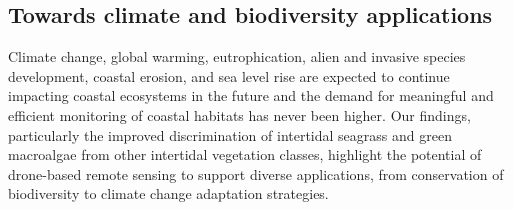 \documentclass[
  number]{elsarticle}
\begin{document}
\subsection{Towards climate and biodiversity
applications}\label{towards-climate-and-biodiversity-applications}

Climate change, global warming, eutrophication, alien and invasive
species development, coastal erosion, and sea level rise are expected to
continue impacting coastal ecosystems in the future
\citetext{\citealp{SCHIBALSKI2022101414}; \citealp[
]{holon2018predictive}; \citealp{marquet2024global}} and the demand for
meaningful and efficient monitoring of coastal habitats has never been
higher\citetext{\citealp[ ]{muller2018satellite}; \citealp[
]{villalobos2023remote}; \citealp{oiry2021using}}. Our findings,
particularly the improved discrimination of intertidal seagrass and
green macroalgae from other intertidal vegetation classes, highlight the
potential of drone-based remote sensing to support diverse applications,
from conservation of biodiversity to climate change adaptation
strategies.
\end{document}
